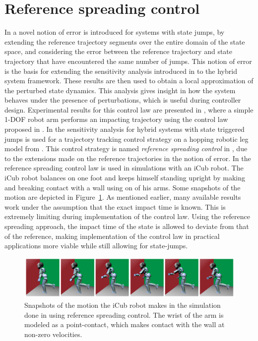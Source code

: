 \documentclass[../DC2017114Bouma.tex]{subfiles}
\begin{document}
\section{Reference spreading control}
In \cite{Saccon2014,Rijnen2015} a novel notion of error is introduced for systems with state jumps, by extending the reference trajectory segments over the entire domain of the state space, and considering the error between the reference trajectory and state trajectory that have encountered the same number of jumps. This notion of error is the basis for extending the sensitivity analysis introduced in \cite{Khalil1996} to the hybrid system framework. These results are then used to obtain a local approximation of the perturbed state dynamics. This analysis gives insight in how the system behaves under the presence of perturbations, which is useful during controller design. Experimental results for this control law are presented in \cite{Incremona2015}, where a simple 1-DOF robot arm performs an impacting trajectory using the control law proposed in \cite{Saccon2014}. In \cite{Rijnen2016} the sensitivity analysis for hybrid systems with state triggered jumps is used for a trajectory tracking control strategy on a hopping robotic leg model from \cite{Tsagarakis2013}. This control strategy is named \textit{reference spreading control} in \cite{Rijnen2017}, due to the extensions made on the reference trajectories in the notion of error. In \cite{Rijnen2017a} the reference spreading control law is used in simulations with an iCub robot. The iCub robot balances on one foot and keeps himself standing upright by making and breaking contact with a wall using on of his arms. Some snapshots of the motion are depicted in Figure~\ref{fig:rijnen2017}. As mentioned earlier, many available results work under the assumption that the exact impact time is known. This is extremely limiting during implementation of the control law. Using the reference spreading approach, the impact time of the state is allowed to deviate from that of the reference, making implementation of the control law in practical applications more viable while still allowing for state-jumps.

\begin{figure}[H]
\centering
\includegraphics[width=\textwidth]{rijnen2017.PNG}\caption{Snapshots of the motion the iCub robot makes in the simulation done in \cite{Rijnen2017a} using reference spreading control. The wrist of the arm is modeled as a point-contact, which makes contact with the wall at non-zero velocities.}\label{fig:rijnen2017}
\end{figure}
\end{document}
